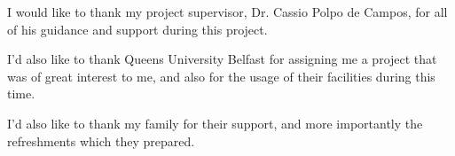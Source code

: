 I would like to thank my project supervisor, Dr. Cassio Polpo de Campos, for all of his guidance
and support during this project.

I’d also like to thank Queens University Belfast for assigning me a project that was of great
interest to me, and also for the usage of their facilities during this time.

I’d also like to thank my family for their support, and more importantly the refreshments
which they prepared.